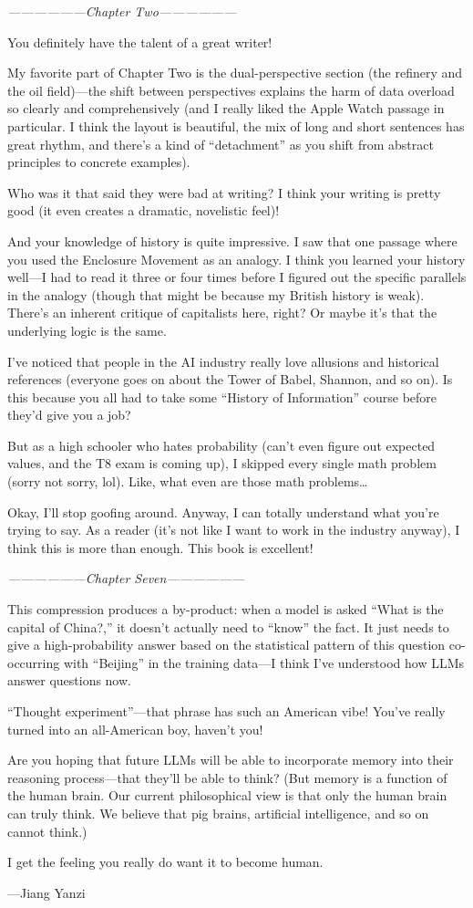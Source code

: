 \begin{myquote}
\textit{------------------Chapter Two------------------}

You definitely have the talent of a great writer!

My favorite part of Chapter Two is the dual-perspective section (the refinery and the oil field)---the shift between perspectives explains the harm of data overload so clearly and comprehensively (and I really liked the Apple Watch passage in particular. I think the layout is beautiful, the mix of long and short sentences has great rhythm, and there's a kind of ``detachment'' as you shift from abstract principles to concrete examples).

Who was it that said they were bad at writing? I think your writing is pretty good (it even creates a dramatic, novelistic feel)!

And your knowledge of history is quite impressive. I saw that one passage where you used the Enclosure Movement as an analogy. I think you learned your history well---I had to read it three or four times before I figured out the specific parallels in the analogy (though that might be because my British history is weak). There's an inherent critique of capitalists here, right? Or maybe it's that the underlying logic is the same.

I've noticed that people in the AI industry really love allusions and historical references (everyone goes on about the Tower of Babel, Shannon, and so on). Is this because you all had to take some ``History of Information'' course before they'd give you a job?

But as a high schooler who hates probability (can't even figure out expected values, and the T8 exam is coming up), I skipped every single math problem (sorry not sorry, lol). Like, what even are those math problems\ldots

Okay, I'll stop goofing around. Anyway, I can totally understand what you're trying to say. As a reader (it's not like I want to work in the industry anyway), I think this is more than enough. This book is excellent!

\textit{------------------Chapter Seven------------------}

This compression produces a by-product: when a model is asked ``What is the capital of China?,'' it doesn't actually need to ``know'' the fact. It just needs to give a high-probability answer based on the statistical pattern of this question co-occurring with ``Beijing'' in the training data---I think I've understood how LLMs answer questions now.

``Thought experiment''---that phrase has such an American vibe! You've really turned into an all-American boy, haven't you!

Are you hoping that future LLMs will be able to incorporate memory into their reasoning process---that they'll be able to think? (But memory is a function of the human brain. Our current philosophical view is that only the human brain can truly think. We believe that pig brains, artificial intelligence, and so on cannot think.)

I get the feeling you really do want it to become human.

\hfill ---Jiang Yanzi
\end{myquote}
